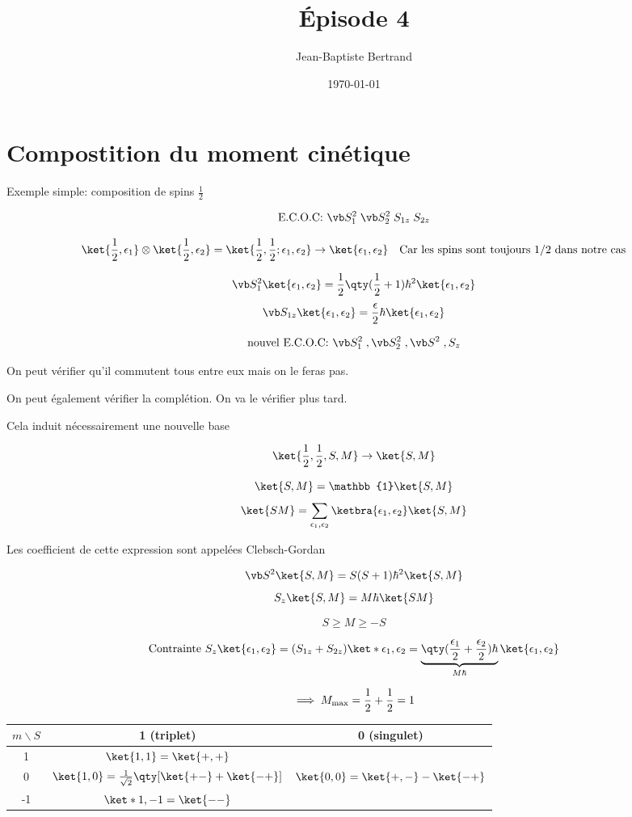 \documentclass{article}
\title{Épisode 4}
\author{Jean-Baptiste Bertrand}
\date{\today}
\begin{document}
\maketitle

\section*{Compostition du moment cinétique}

Exemple simple: composition de spins $\frac12$

$$\text{E.C.O.C: } \vb S_1^2\; \vb S_2^2\; S_{1z}\; S_{2z}$$

$$\ket{\frac{1}{2}, \epsilon_1} \otimes \ket{\frac12, \epsilon_2} = \ket{\frac12,\frac12;\epsilon_1,\epsilon_2} \to \ket{\epsilon_1, \epsilon_2} \quad \text{Car les spins sont toujours 1/2 dans notre cas}$$

$$\vb S_1^2 \ket{\epsilon_1,\epsilon_2} = \frac12\qty(\frac12+1)\hbar^2\ket{\epsilon_1,\epsilon_2}$$
$$\vb S_{1z} \ket{\epsilon_1,\epsilon_2} = \frac\epsilon2\hbar\ket{\epsilon_1,\epsilon_2}$$


$$\text{nouvel E.C.O.C: } \vb S_1^2\;, \vb S_2^2\;, \vb S^2\;, S_z$$




On peut vérifier qu'il commutent tous entre eux mais on le feras pas.

On peut également vérifier la complétion. On va le vérifier plus tard.

Cela induit nécessairement une nouvelle base

$$\ket{\frac12,\frac12, S, M} \to \ket{S,M}$$

$$\ket{S,M} =\mathbb{1}\ket{S,M}$$
$$\ket{SM} = \sum_{\epsilon_1, \epsilon_2} \ketbra{\epsilon_1,\epsilon_2}\ket{S,M}$$

Les coefficient de cette expression sont appelées Clebsch-Gordan

$$\vb S^2\ket{S,M} = S(S+1)\hbar^2\ket{S,M}$$
$$S_z \ket{S,M}= M\hbar \ket{SM}$$


$$\boxed{S \geq M \geq -S}$$

$$\text{Contrainte } S_z\ket{\epsilon_1, \epsilon_2} = (S_{1z} + S_{2z})\ket*{\epsilon_1, \epsilon_2} = \underbrace{\qty(\frac{\epsilon_1}2 + \frac{\epsilon_2}{2}) \hbar}_{M\hbar} \ket{\epsilon_1, \epsilon_2}$$

$$\implies M_{\rm max} = \frac 12 + \frac 12 = 1$$

\begin{tabular}[]{|c|c|c|}
	\hline
	$m\backslash S$ & 1 (triplet) &0 (singulet) \\ \hline
	1   & $\ket{1,1} = \ket{+,+}$ &\\ \hline
	0 	& $\ket{1,0} = \frac{1}{\sqrt{2}}\qty[\ket{+-}+\ket{-+}]$ &$\ket{0,0} = \ket{+,-}-\ket{-+}$\\\hline
	-1	& $\ket*{1, -1} = \ket{--}$ & \\\hline
\end{tabular}
\end{document}
